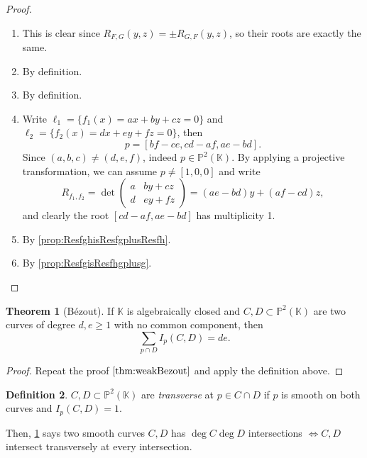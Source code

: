\documentclass{article}
\newcommand{\K}{\mathbb{K}}
\newcommand{\p}{\mathbb{P}}
\theoremstyle{definition}
\newtheorem{defn}{Definition}[subsection]
\newtheorem{thm}[defn]{Theorem}
\begin{document}
\begin{proof}
\begin{enumerate}
\item This is clear since $R_{F,G}(y,z)=\pm R_{G,F}(y,z)$, so their roots are exactly the same.
\item By definition.
\item By definition.
\item Write $\ell_1=\{f_1(x)=ax+by+cz=0\}$ and $\ell_2=\{f_2(x)=dx+ey+fz=0\}$, then
\[
p=[bf-ce,cd-af,ae-bd].
\]
Since $(a,b,c)\neq (d,e,f)$, indeed $p\in\p^2(\K)$. By applying a projective transformation, we can assume $p\neq [1,0,0]$ and write
\[
R_{f_1,f_2}=\det\begin{pmatrix}
a & by+cz \\ d & ey+fz
\end{pmatrix}=(ae-bd)y+(af-cd)z,
\]
and clearly the root $[cd-af,ae-bd]$ has multiplicity 1. 
\item By \ref{prop:ResfghisResfgplusResfh}.
\item By \ref{prop:ResfgisResfhgplusg}.
\end{enumerate}
\end{proof}

\begin{thm}[Bézout]
\label{thm:strongBezout}
If $\K$ is algebraically closed and $C,D\subset\p^2(\K)$ are two curves of degree $d,e\geq 1$ with no common component, then
\[
\sum_{p\cap D}I_p(C,D)=de.
\]
\end{thm}
\begin{proof}
Repeat the proof $\ref{thm:weakBezout}$ and apply the definition above.
\end{proof}

\begin{defn}
$C,D\subset\p^2(\K)$ are \textit{transverse} at $p\in C\cap D$ if $p$ is smooth on both curves and $I_p(C,D)=1$.
\end{defn}
Then, \ref{thm:strongBezout} says two smooth curves $C,D$ has $\deg C\deg D$ intersections $\iff C,D$ intersect transversely at every intersection.
\end{document}
